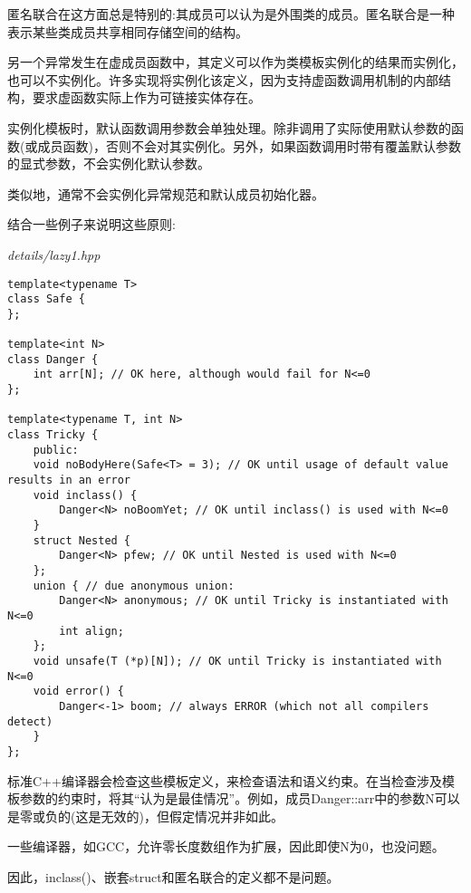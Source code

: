 \begin{tcolorbox}[colback=webgreen!5!white,colframe=webgreen!75!black]
\hspace*{0.75cm}匿名联合在这方面总是特别的:其成员可以认为是外围类的成员。匿名联合是一种表示某些类成员共享相同存储空间的结构。
\end{tcolorbox}

另一个异常发生在虚成员函数中，其定义可以作为类模板实例化的结果而实例化，也可以不实例化。许多实现将实例化该定义，因为支持虚函数调用机制的内部结构，要求虚函数实际上作为可链接实体存在。 

实例化模板时，默认函数调用参数会单独处理。除非调用了实际使用默认参数的函数(或成员函数)，否则不会对其实例化。另外，如果函数调用时带有覆盖默认参数的显式参数，不会实例化默认参数。

类似地，通常不会实例化异常规范和默认成员初始化器。

结合一些例子来说明这些原则:

\noindent
\textit{details/lazy1.hpp}
\begin{lstlisting}[style=styleCXX]
template<typename T>
class Safe {
};

template<int N>
class Danger {
	int arr[N]; // OK here, although would fail for N<=0
};

template<typename T, int N>
class Tricky {
	public:
	void noBodyHere(Safe<T> = 3); // OK until usage of default value results in an error
	void inclass() {
		Danger<N> noBoomYet; // OK until inclass() is used with N<=0
	}
	struct Nested {
		Danger<N> pfew; // OK until Nested is used with N<=0
	};
	union { // due anonymous union:
		Danger<N> anonymous; // OK until Tricky is instantiated with N<=0
		int align;
	};
	void unsafe(T (*p)[N]); // OK until Tricky is instantiated with N<=0
	void error() {
		Danger<-1> boom; // always ERROR (which not all compilers detect)
	}
};
\end{lstlisting}

标准C++编译器会检查这些模板定义，来检查语法和语义约束。在当检查涉及模板参数的约束时，将其“认为是最佳情况”。例如，成员Danger::arr中的参数N可以是零或负的(这是无效的)，但假定情况并非如此。

\begin{tcolorbox}[colback=webgreen!5!white,colframe=webgreen!75!black]
\hspace*{0.75cm}一些编译器，如GCC，允许零长度数组作为扩展，因此即使N为0，也没问题。
\end{tcolorbox}

因此，inclass()、嵌套struct和匿名联合的定义都不是问题。

